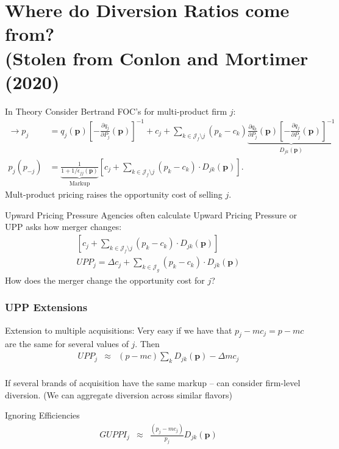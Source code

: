 \documentclass[xcolor=pdftex,dvipsnames,table,mathserif,aspectratio=169]{beamer}
\begin{document}
\section{Where do Diversion Ratios come from?\\ (Stolen from Conlon and Mortimer (2020)}
\begin{frame}{In Theory}
\footnotesize
Consider Bertrand FOC's for multi-product firm $j$:
\begin{align*}
\label{eq:best_response}
\rightarrow \nonumber p_j &=q_{j}(\mathbf{p}) \left[-\frac{\partial q_{j}}{\partial P_{j}}(\mathbf{p})\right]^{-1} + c_{j} + \sum_{k \in \mathcal{J}_{f} \setminus j} \left(p_{k}-c_{k}\right) \underbrace{\frac{\partial q_{k}}{\partial P_{j}}(\mathbf{p})\left[-\frac{\partial q_{j}}{\partial P_{j}}(\mathbf{p})\right]^{-1}}_{D_{jk}(\mathbf{p})}\\
p_j(p_{-j}) &= \underbrace{\frac{1}{1+1/\epsilon_{jj}(\mathbf{p})}}_{\text{Markup}} \left[ c_j + \sum_{k \in \mathcal{J}_{f} \setminus j}  (p_k-c_k) \cdot  D_{jk} (\mathbf{p}) \right].
\end{align*}
Mult-product pricing \alert{raises the opportunity cost} of selling $j$.
\end{frame}

\begin{frame}{Upward Pricing Pressure}
Agencies often calculate \alert{Upward Pricing Pressure} or UPP asks how merger \alert{changes}:
\begin{align*}
\left[ c_j + \sum_{k \in \mathcal{J}_{f} \setminus j}  (p_k-c_k) \cdot  D_{jk} (\mathbf{p}) \right] \\
UPP_j = \Delta c_j + \sum_{k \in \mathcal{J}_{g}}  (p_k-c_k) \cdot  D_{jk} (\mathbf{p}) 
\end{align*}
How does the merger change the \alert{opportunity cost} for $j$?
\end{frame}

\begin{frame}
\frametitle{UPP Extensions}
\begin{block}{Extension to multiple acquisitions:}
Very easy if we have that $p_j - mc_j = p - mc$ are the same for several values of $j$.  Then
\begin{eqnarray*}
UPP_j &\approx& (p - mc) \sum_k D_{jk}(\mathbf{p}) -  \Delta mc_j \\
\end{eqnarray*}
\end{block}
If several brands of acquisition have the same markup -- can consider firm-level diversion. (We can aggregate diversion across similar flavors)
\begin{block}{Ignoring Efficiencies}
\begin{eqnarray*}
GUPPI_j &\approx& \frac{(p_j - mc_j)}{p_j} D_{jk}(\mathbf{p}) \\
\end{eqnarray*}
\end{block}
\end{frame}
\end{document}
